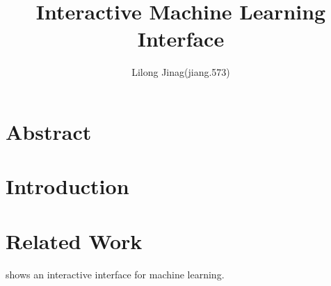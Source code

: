 \documentclass{article}
\begin{document}
\title{Interactive Machine Learning Interface}
\author{Lilong Jinag(jiang.573)}
\maketitle
\section{Abstract}
\section{Introduction}
\section{Related Work}
\cite{crotty2015vizdom} shows an interactive interface for machine learning. 


\end{document}
